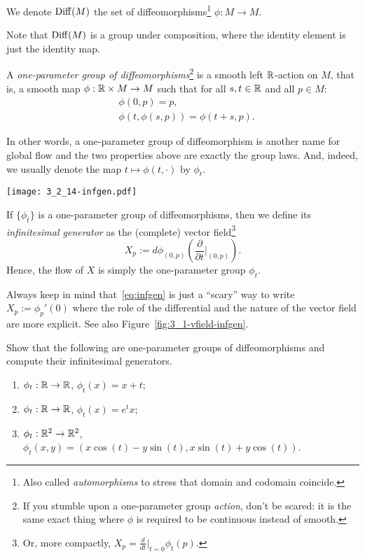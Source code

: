 \begin{definition}
	We denote $\operatorname{Diff}(M)$ the set of diffeomorphisms\footnote{Also called \emph{automorphisms} to stress that domain and codomain coincide.} $\phi: M \to M$.

	Note that $\operatorname{Diff}(M)$ is a group under composition, where the identity element is just the identity map.
\end{definition}

\begin{definition}
	A \emph{one-parameter group of diffeomorphisms}\footnote{If you stumble upon a one-parameter group \emph{action}, don't be scared: it is the same exact thing where $\phi$ is required to be continuous instead of smooth.} is a smooth left $\mathbb{R}$-action on $M$, that is, a smooth map $\phi:\mathbb{R}\times M \to M$ such that for all $s,t\in\mathbb{R}$ and all $p\in M$:
	\begin{align}
		 & \phi(0,p) = p,                      \\
		 & \phi(t, \phi(s, p)) = \phi(t+s, p).
	\end{align}

	In other words, a one-parameter group of diffeomorphism is another name for global flow and the two properties above are exactly the group laws.
	And, indeed, we usually denote the map $t\mapsto\phi(t,\cdot)$ by $\phi_t$.


	\begin{marginfigure}
		\texttt{[image: 3\_2\_14-infgen.pdf]}
	\end{marginfigure}
	If $\{\phi_t\}$ is a one-parameter group of diffeomorphisms, then we define its \emph{infinitesimal generator} as the (complete) vector field\footnote{Or, more compactly, ${X_p = \frac{d}{dt}\big|_{t=0}\phi_t(p)}$.}
	\begin{equation}\label{eq:infgen}
		X_p := d\phi_{(0,p)}\left(\frac{\partial}{\partial t}\Big|_{(0,p)}\right).
	\end{equation}
	Hence, the flow of $X$ is simply the one-parameter group $\phi_t$.

	Always keep in mind that~\eqref{eq:infgen} is just a ``scary'' way to write $X_p := \phi_p'(0)$ where the role of the differential and the nature of the vector field are more explicit. See also Figure~\ref{fig:3_1-vfield-infgen}.
\end{definition}

\begin{exercise}
	Show that the following are one-parameter groups of diffeomorphisms and compute their infinitesimal generators.
	\begin{enumerate}
		\item $\phi_t:\mathbb{R}\to\mathbb{R}$, $\phi_t(x) = x + t$;
		\item $\phi_t:\mathbb{R}\to\mathbb{R}$, $\phi_t(x) = e^t x$;
		\item $\phi_t:\mathbb{R}^2\to\mathbb{R}^2$, $\phi_t(x,y) = (x\cos(t) - y\sin(t), x\sin(t)+y\cos(t))$.
	\end{enumerate}
\end{exercise}

